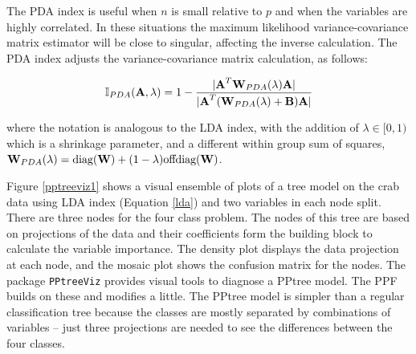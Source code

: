 \documentclass[smallextended,natbib]{svjour3}\usepackage[]{graphicx}\usepackage[]{xcolor}
\newcommand{\blA}{\mbox{\boldmath {\bf A}}}
\newcommand{\blB}{\mbox{\boldmath {\bf B}}}
\newcommand{\blW}{\mbox{\boldmath {\bf W}}}
\begin{document}
The PDA index is useful when $n$ is small relative to $p$ and when the variables are highly correlated. In these situations the maximum likelihood variance-covariance matrix estimator will be close to singular, affecting the inverse calculation. The PDA index adjusts the variance-covariance matrix calculation, as follows:


\begin{equation}
\mathbb{I}_{PDA}(\blA,\lambda)=1-\frac{|\blA^T \blW_{PDA}(\lambda)\blA|}{|\blA^T (\blW_{PDA}(\lambda)+\blB) \blA|}
\end{equation}

\noindent where the notation is analogous to the LDA index, with the addition of $\lambda \in [0,1)$ which is a shrinkage parameter, and a different within group sum of squares, $\blW_{PDA}(\lambda)=\mbox{diag}(\blW)+(1-\lambda)\mbox{offdiag}(\blW)$.

Figure \ref{pptreeviz1} shows a visual ensemble of plots of a tree model on the crab data using LDA index (Equation \ref{lda}) and two variables in each node split. There are three nodes for the four class problem. The nodes of this tree are based on projections of the data and their coefficients form the building block to calculate the variable importance. The density plot displays the data projection at each node, and the mosaic plot shows the confusion matrix for the nodes.
The package \verb#PPtreeViz# provides visual tools to diagnose a PPtree model. The PPF builds on these and modifies a little. The PPtree model is simpler than a regular classification tree because the classes are mostly separated by combinations of variables -- just three projections are needed to see the differences between the four classes.
\end{document}
